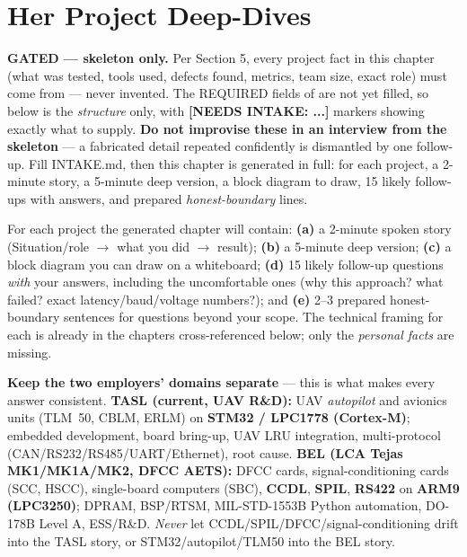\chapter{Her Project Deep-Dives}
\label{ch:project-deepdives}

\begin{partnote}
\textbf{GATED --- skeleton only.} Per  Section 5, every project
fact in this chapter (what was tested, tools used, defects found, metrics, team
size, exact role) must come from  --- never invented. The
REQUIRED fields of  are not yet filled, so below is the
\emph{structure} only, with \textbf{[NEEDS INTAKE: ...]} markers showing exactly
what to supply. \textbf{Do not improvise these in an interview from the
skeleton} --- a fabricated detail repeated confidently is dismantled by one
follow-up. Fill INTAKE.md, then this chapter is generated in full: for each
project, a 2-minute story, a 5-minute deep version, a block diagram to draw,
15 likely follow-ups with answers, and prepared \emph{honest-boundary} lines.
\end{partnote}

For each project the generated chapter will contain: \textbf{(a)} a 2-minute
spoken story (Situation/role $\rightarrow$ what you did $\rightarrow$ result);
\textbf{(b)} a 5-minute deep version; \textbf{(c)} a block diagram you can draw
on a whiteboard; \textbf{(d)} 15 likely follow-up questions \emph{with} your
answers, including the uncomfortable ones (why this approach? what failed? exact
latency/baud/voltage numbers?); and \textbf{(e)} 2--3 prepared honest-boundary
sentences for questions beyond your scope. The technical framing for each is
already in the chapters cross-referenced below; only the \emph{personal facts}
are missing.

\begin{keyidea}
\textbf{Keep the two employers' domains separate} --- this is what makes every
answer consistent. \textbf{TASL (current, UAV R\&D):} UAV \emph{autopilot} and
avionics units (TLM~50, CBLM, ERLM) on \textbf{STM32 / LPC1778 (Cortex-M)};
embedded development, board bring-up, UAV LRU integration, multi-protocol
(CAN/RS232/RS485/UART/Ethernet), root cause. \textbf{BEL (LCA Tejas MK1/MK1A/MK2,
DFCC AETS):} DFCC cards, signal-conditioning cards (SCC, HSCC), single-board
computers (SBC), \textbf{CCDL}, \textbf{SPIL}, \textbf{RS422} on \textbf{ARM9
(LPC3250)}; DPRAM, BSP/RTSM, MIL-STD-1553B Python automation, DO-178B Level A,
ESS/R\&D. \emph{Never} let CCDL/SPIL/DFCC/signal-conditioning drift into the TASL
story, or STM32/autopilot/TLM50 into the BEL story.
\end{keyidea}

